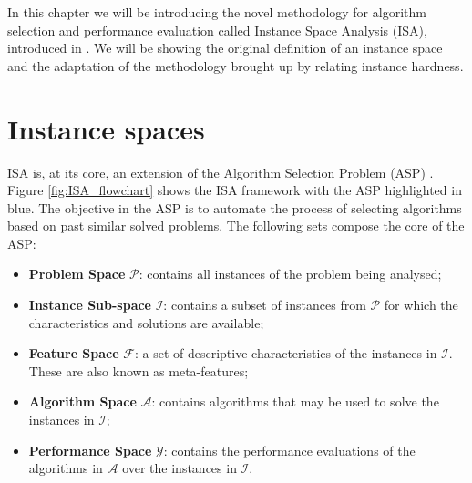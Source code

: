 In this chapter we will be introducing the novel methodology for algorithm selection and performance evaluation called Instance Space Analysis (ISA), introduced in . We will be showing the original definition of an instance space and the adaptation of the methodology brought up by  relating instance hardness.

\section{Instance spaces}

ISA is, at its core, an extension of the Algorithm Selection Problem (ASP) \cite{RICE1976}. Figure \ref{fig:ISA_flowchart} shows the ISA framework with the ASP highlighted in blue. The objective in the ASP is to automate the process of selecting algorithms based on past similar solved problems. The following sets compose the core of the ASP:

\begin{itemize}
	\item \textbf{Problem Space} $\mathcal{P}$: contains all instances of the problem being analysed;
	\item \textbf{Instance Sub-space} $\mathcal{I}$: contains a subset of instances from $\mathcal{P}$ for which the characteristics and solutions are available;
	\item \textbf{Feature Space} $\mathcal{F}$: a set of descriptive characteristics of the instances in $\mathcal{I}$. These are also known as meta-features;
	\item \textbf{Algorithm Space} $\mathcal{A}$: contains algorithms that may be used to solve the instances in $\mathcal{I}$;
	\item \textbf{Performance Space} $\mathcal{Y}$: contains the performance evaluations of the algorithms in $\mathcal{A}$ over the instances in $\mathcal{I}$.
\end{itemize}

